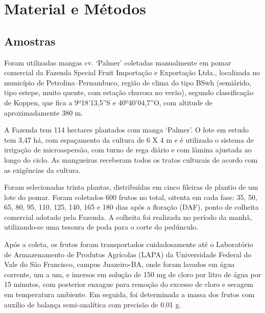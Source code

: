 \section{Material e Métodos}



\subsection{Amostras}

Foram utilizadas mangas cv. ‘Palmer’ coletadas manualmente em pomar comercial da Fazenda Special Fruit Importação e Exportação Ltda., localizada no município de Petrolina–Pernambuco, região de clima do tipo BSwh (semiárido, tipo estepe, muito quente, com estação chuvosa no verão), segundo classificação de Koppen, que fica a 9º18'13,5''S e 40º40'04,7''O, com altitude de aproximadamente 380 m.

A Fazenda tem 114 hectares plantados com manga ‘Palmer’. O lote em estudo tem 3,47 há, com espaçamento da cultura de 6 X 4 m e é utilizado o sistema de irrigação de microaspersão, com turno de rega diário e com lâmina ajustada ao longo do ciclo. As mangueiras receberam todos os tratos culturais de acordo com as exigências da cultura.

Foram selecionadas trinta plantas, distribuídas em cinco fileiras de plantio de um lote do pomar. Foram coletados 600 frutos no total, oitenta em cada fase: 35, 50, 65, 80, 95, 110, 125, 140, 165 e 180 dias após a floração (DAF), ponto de colheita comercial adotado pela Fazenda. A colheita foi realizada no período da manhã, utilizando-se uma tesoura de poda para o corte do pedúnculo.

Após a coleta, os frutos foram transportados cuidadosamente até o Laboratório de Armazenamento de Produtos Agrícolas (LAPA) da Universidade Federal do Vale do São Francisco, campus Juazeiro-BA, onde foram lavados em água corrente, um a um, e imersos em solução de 150 mg de cloro por litro de água por 15 minutos, com posterior enxague para remoção do excesso de cloro e secagem em temperatura ambiente. Em seguida, foi determinada a massa dos frutos com auxílio de balança semi-analítica com precisão de 0.01 g.

